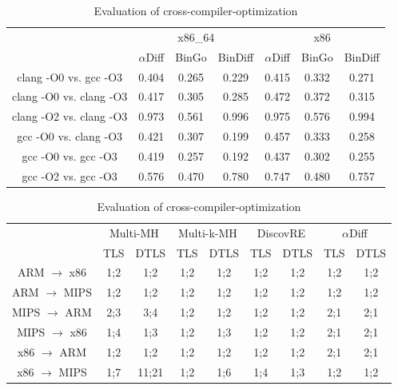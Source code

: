 \begin{table}[!t]
\newcommand{\tabincell}[2]{\begin{tabular}{@{}#1@{}}#2\end{tabular}}
\caption{Evaluation of cross-compiler-optimization}
\centering
\begin{tabular}{c|c|c|c|c|c|c}  %
\hline  
\hline
\multirow{2}{*}{} &
\multicolumn{3}{|c|}{x86\_64} &
\multicolumn{3}{c}{x86} \\
 & $\alpha$Diff & BinGo & BinDiff & $\alpha$Diff & BinGo & BinDiff \\  
\hline
clang -O0 vs. gcc -O3 & 0.404 & 0.265 & 0.229 & 0.415 & 0.332 & 0.271 \\
clang -O0 vs. clang -O3 & 0.417 & 0.305 & 0.285 & 0.472 & 0.372 & 0.315 \\
clang -O2 vs. clang -O3 & 0.973 & 0.561 & 0.996 & 0.975 & 0.576 & 0.994 \\  
gcc -O0 vs. clang -O3 & 0.421 & 0.307 & 0.199 & 0.457 & 0.333 & 0.258 \\
gcc -O0 vs. gcc -O3 & 0.419 & 0.257 & 0.192 & 0.437 & 0.302 & 0.255 \\
gcc -O2 vs. gcc -O3 & 0.576 & 0.470 & 0.780 & 0.747 & 0.480 & 0.757 \\
\hline  
\hline  
\end{tabular}  
\end{table}

\begin{table}[!t]
\newcommand{\tabincell}[2]{\begin{tabular}{@{}#1@{}}#2\end{tabular}}
\caption{Evaluation of cross-compiler-optimization}
\centering
\begin{tabular}{ccccccccc}  %
\hline  
\hline
\multirow{2}{*}{} &
\multicolumn{2}{c}{Multi-MH} &
\multicolumn{2}{c}{Multi-k-MH} &
\multicolumn{2}{c}{DiscovRE} &
\multicolumn{2}{c}{$\alpha$Diff} \\
 From $\rightarrow$ to & TLS & DTLS & TLS & DTLS & TLS & DTLS & TLS & DTLS \\  
\hline
ARM $\rightarrow$ x86 & 1;2 & 1;2 & 1;2 & 1;2 & 1;2 & 1;2 & 1;2 & 1;2 \\
ARM $\rightarrow$ MIPS & 1;2 & 1;2 & 1;2 & 1;2 & 1;2 & 1;2 & 1;2 & 1;2 \\
\hline
MIPS $\rightarrow$ ARM & 2;3 & 3;4 & 1;2 & 1;2 & 1;2 & 1;2 & 2;1 & 2;1 \\
MIPS $\rightarrow$ x86 & 1;4 & 1;3 & 1;2 & 1;3 & 1;2 & 1;2 & 2;1 & 2;1 \\
\hline
x86 $\rightarrow$ ARM & 1;2 & 1;2 & 1;2 & 1;2 & 1;2 & 1;2 & 2;1 & 2;1 \\
x86 $\rightarrow$ MIPS & 1;7 & 11;21 & 1;2 & 1;6 & 1;4 & 1;3 & 1;2 & 1;2 \\
\hline  
\hline  
\end{tabular}  
\end{table}

